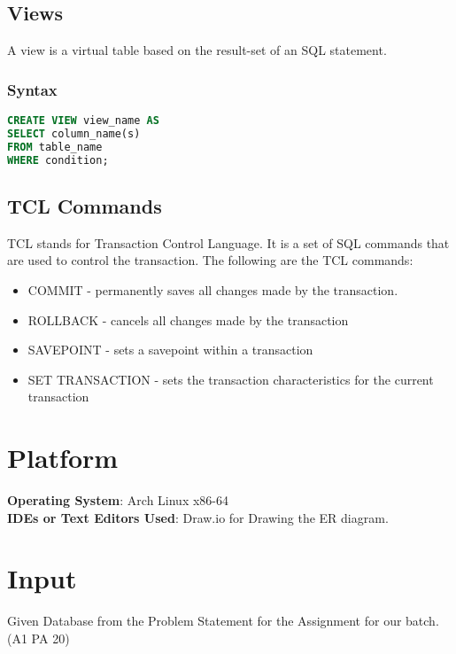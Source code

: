 \documentclass[11pt]{article}
\begin{document}
\subsection{Views}

A view is a virtual table based on the result-set of an SQL statement.

\subsubsection*{Syntax}

\begin{lstlisting}[language=sql]
CREATE VIEW view_name AS
SELECT column_name(s)
FROM table_name
WHERE condition;
\end{lstlisting}

\subsection{TCL Commands}

TCL stands for Transaction Control Language. It is a set of SQL commands that are used to control the transaction. The following are the TCL commands:

\begin{itemize}
    \item COMMIT - permanently saves all changes made by the transaction. 
    \item ROLLBACK - cancels all changes made by the transaction
    \item SAVEPOINT - sets a savepoint within a transaction
    \item SET TRANSACTION - sets the transaction characteristics for the current transaction
\end{itemize}

\section{Platform}
\textbf{Operating System}: Arch Linux x86-64 \\
\textbf{IDEs or Text Editors Used}: Draw.io for Drawing the ER diagram. \\


\section{Input}
Given Database from the Problem Statement for the Assignment for our batch. (A1 PA 20)
\end{document}

